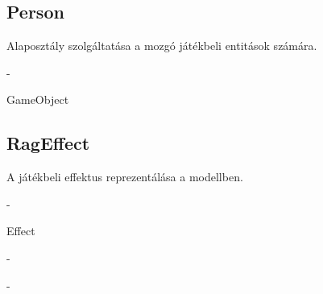 \subsection{Person}
\begin{class-template-responsibility}
    Alaposztály szolgáltatása a mozgó játékbeli entitások számára.
\end{class-template-responsibility}
\begin{class-template-interface}
    -
\end{class-template-interface}
\begin{class-template-baseclass}
    GameObject
\end{class-template-baseclass}
\begin{class-template-attribute}
\end{class-template-attribute}
\begin{class-template-method}
\end{class-template-method}

\subsection{RagEffect}
\begin{class-template-responsibility}
    A játékbeli effektus reprezentálása a modellben.
\end{class-template-responsibility}
\begin{class-template-interface}
    -
\end{class-template-interface}
\begin{class-template-baseclass}
    Effect
\end{class-template-baseclass}
\begin{class-template-attribute}
    -
\end{class-template-attribute}
\begin{class-template-method}
    -
\end{class-template-method}

